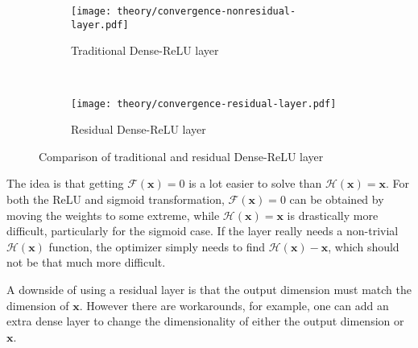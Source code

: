 \begin{figure}[H]
    \centering
    \begin{subfigure}[b]{0.4\textwidth}
        \centering
        \texttt{[image: theory/convergence-nonresidual-layer.pdf]}
        \caption{Traditional Dense-ReLU layer}
    \end{subfigure}
    ~ %
    \begin{subfigure}[b]{0.4\textwidth}
        \centering
        \texttt{[image: theory/convergence-residual-layer.pdf]}
        \caption{Residual Dense-ReLU layer}
    \end{subfigure}
    \caption{Comparison of traditional and residual Dense-ReLU layer}
\end{figure}

The idea is that getting $\mathcal{F}(\mathbf{x}) = 0$ is a lot easier to solve than $\mathcal{H}(\mathbf{x}) = \mathbf{x}$. For both the ReLU and sigmoid transformation, $\mathcal{F}(\mathbf{x}) = 0$ can be obtained by moving the weights to some extreme, while $\mathcal{H}(\mathbf{x}) = \mathbf{x}$ is drastically more difficult, particularly for the sigmoid case. If the layer really needs a non-trivial $\mathcal{H}(\mathbf{x})$ function, the optimizer simply needs to find $\mathcal{H}(\mathbf{x}) - \mathbf{x}$, which should not be that much more difficult.

A downside of using a residual layer is that the output dimension must match the dimension of $\mathbf{x}$. However there are workarounds, for example, one can add an extra dense layer to change the dimensionality of either the output dimension or $\mathbf{x}$.

